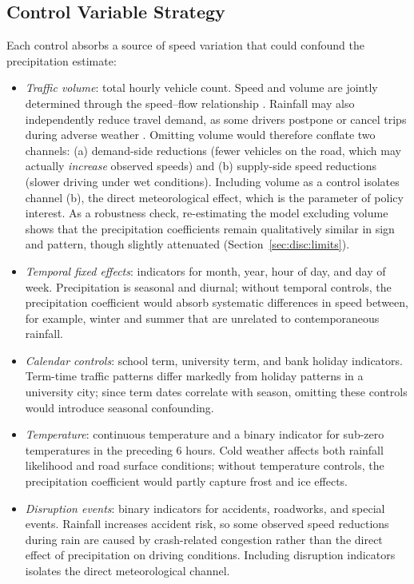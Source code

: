 \documentclass[review,authoryear]{elsarticle}
\begin{document}
\subsection{Control Variable Strategy}
\label{sec:method:controls}

Each control absorbs a source of speed variation that could confound the precipitation estimate:

\begin{itemize}[nosep]
    \item \textit{Traffic volume}: total hourly vehicle count. Speed and volume are jointly determined through the speed--flow relationship \citep{hranac2006empirical}. Rainfall may also independently reduce travel demand, as some drivers postpone or cancel trips during adverse weather \citep{koetse2009impact,becker2026rainfall}. Omitting volume would therefore conflate two channels: (a) demand-side reductions (fewer vehicles on the road, which may actually \textit{increase} observed speeds) and (b) supply-side speed reductions (slower driving under wet conditions). Including volume as a control isolates channel (b), the direct meteorological effect, which is the parameter of policy interest. As a robustness check, re-estimating the model excluding volume shows that the precipitation coefficients remain qualitatively similar in sign and pattern, though slightly attenuated (Section~\ref{sec:disc:limits}).
    \item \textit{Temporal fixed effects}: indicators for month, year, hour of day, and day of week. Precipitation is seasonal and diurnal; without temporal controls, the precipitation coefficient would absorb systematic differences in speed between, for example, winter and summer that are unrelated to contemporaneous rainfall.
    \item \textit{Calendar controls}: school term, university term, and bank holiday indicators. Term-time traffic patterns differ markedly from holiday patterns in a university city; since term dates correlate with season, omitting these controls would introduce seasonal confounding.
    \item \textit{Temperature}: continuous temperature and a binary indicator for sub-zero temperatures in the preceding 6 hours. Cold weather affects both rainfall likelihood and road surface conditions; without temperature controls, the precipitation coefficient would partly capture frost and ice effects.
    \item \textit{Disruption events}: binary indicators for accidents, roadworks, and special events. Rainfall increases accident risk, so some observed speed reductions during rain are caused by crash-related congestion rather than the direct effect of precipitation on driving conditions. Including disruption indicators isolates the direct meteorological channel.
\end{itemize}
\end{document}
